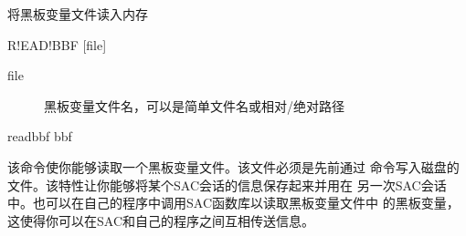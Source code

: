 \label{cmd:readbbf}

将黑板变量文件读入内存

\begin{SACSTX}
R!EAD!BBF [file]
\end{SACSTX}

\begin{description}
\item [file] 黑板变量文件名，可以是简单文件名或相对/绝对路径
\end{description}

\begin{SACDFT}
readbbf bbf
\end{SACDFT}

该命令使你能够读取一个黑板变量文件。该文件必须是先前通过 
命令写入磁盘的文件。该特性让你能够将某个SAC会话的信息保存起来并用在
另一次SAC会话中。也可以在自己的程序中调用SAC函数库以读取黑板变量文件中
的黑板变量，这使得你可以在SAC和自己的程序之间互相传送信息。

